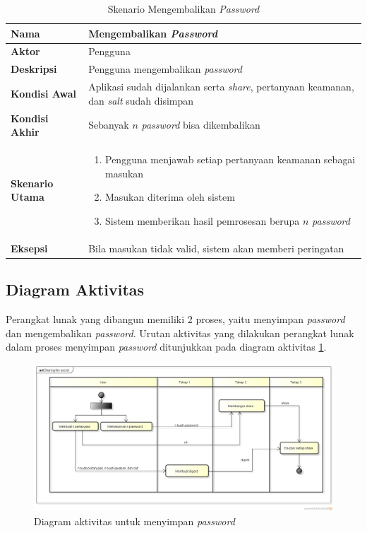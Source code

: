 \begin{table}[h]
	\centering
	\caption{Skenario Mengembalikan \textit{Password}} \label{table:scenario2}
	\begin{tabular}{|l|p{12cm}|}
		\hline
		\textbf{Nama} 					& Mengembalikan \textit{Password} 																									\\ \hline
		\textbf{Aktor}					& Pengguna																																					\\ \hline
		\textbf{Deskripsi} 			& Pengguna mengembalikan \textit{password} 																					\\ \hline
		\textbf{Kondisi Awal} 	& Aplikasi sudah dijalankan	serta \textit{share}, pertanyaan keamanan, dan \textit{salt} sudah disimpan  \\ \hline
		\textbf{Kondisi Akhir}	& Sebanyak $n$ \textit{password} bisa dikembalikan																	\\ \hline
		\textbf{Skenario Utama} & \begin{enumerate}[itemsep=0mm]\item Pengguna menjawab setiap pertanyaan keamanan sebagai masukan \item Masukan diterima oleh sistem \item Sistem memberikan hasil pemrosesan berupa $n$ \textit{password}\end{enumerate} \\ \hline
		\textbf{Eksepsi}				& Bila masukan tidak valid, sistem akan memberi peringatan \\ \hline
	\end{tabular}
\end{table}

\subsection{Diagram Aktivitas}

Perangkat lunak yang dibangun memiliki 2 proses, yaitu menyimpan \textit{password} dan mengembalikan \textit{password}. Urutan aktivitas yang dilakukan perangkat lunak dalam proses menyimpan \textit{password} ditunjukkan pada diagram aktivitas \ref{fig:activity1}.

\begin{figure}[H]
	\centerline{\includegraphics[scale=0.35]{Gambar/sharing-secret}}
	\caption{Diagram aktivitas untuk menyimpan \textit{password}}\label{fig:activity1}
\end{figure}

